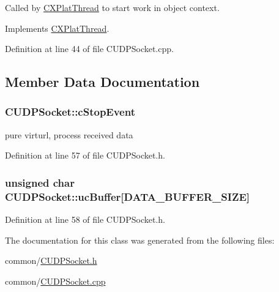 \-Called by \hyperlink{class_c_x_plat_thread}{\-C\-X\-Plat\-Thread} to start work in object context. 



\-Implements \hyperlink{class_c_x_plat_thread_af8a15900817f9673c6fd8e85cdedf27d}{\-C\-X\-Plat\-Thread}.



\-Definition at line 44 of file \-C\-U\-D\-P\-Socket.\-cpp.



\subsection{\-Member \-Data \-Documentation}
\hypertarget{class_c_u_d_p_socket_abded5c32659597c7090dba34bbf3320f}{
\subsubsection[{c\-Stop\-Event}]{ {\bf \-C\-U\-D\-P\-Socket\-::c\-Stop\-Event}}}\label{class_c_u_d_p_socket_abded5c32659597c7090dba34bbf3320f}


pure virturl, process received data 



\-Definition at line 57 of file \-C\-U\-D\-P\-Socket.\-h.

\hypertarget{class_c_u_d_p_socket_adba8b62f17aa86ca7d6dc7514a998d8b}{
\subsubsection[{uc\-Buffer}]{\setlength{\rightskip}{0pt plus 5cm}unsigned char {\bf \-C\-U\-D\-P\-Socket\-::uc\-Buffer}\mbox{[}{\bf \-D\-A\-T\-A\-\_\-\-B\-U\-F\-F\-E\-R\-\_\-\-S\-I\-Z\-E}\mbox{]}}}\label{class_c_u_d_p_socket_adba8b62f17aa86ca7d6dc7514a998d8b}


\-Definition at line 58 of file \-C\-U\-D\-P\-Socket.\-h.



\-The documentation for this class was generated from the following files\-:\begin{DoxyCompactItemize}
\item 
common/\hyperlink{_c_u_d_p_socket_8h}{\-C\-U\-D\-P\-Socket.\-h}\item 
common/\hyperlink{_c_u_d_p_socket_8cpp}{\-C\-U\-D\-P\-Socket.\-cpp}\end{DoxyCompactItemize}
